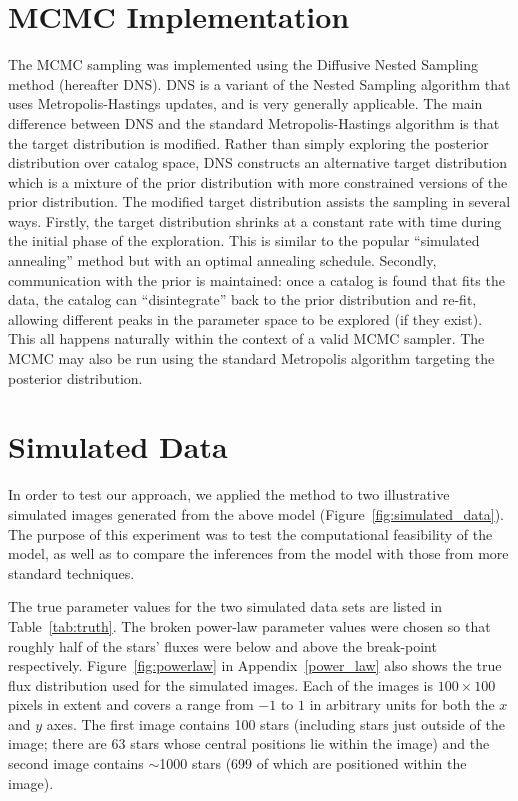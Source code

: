 \documentclass[12pt, preprint]{aastex}
\begin{document}
\section{MCMC Implementation}\label{sec:mcmc}
The MCMC sampling was implemented using the Diffusive Nested Sampling
\citep{dnest} method (hereafter DNS). DNS is a variant of the
Nested Sampling \citep{skilling} algorithm that uses Metropolis-Hastings
updates, and
is very generally applicable. The main difference between DNS and the standard
Metropolis-Hastings algorithm is that the target distribution is modified.
Rather than simply exploring the posterior distribution over catalog space,
DNS constructs an alternative target distribution which is a mixture of the
prior distribution with more constrained versions of the prior distribution.
The modified target distribution assists the sampling in several ways.
Firstly, the target distribution shrinks at a constant rate with time during the
initial phase of the exploration. This is similar to the popular ``simulated
annealing'' method \citep{annealing, neal} but with an optimal annealing schedule. Secondly,
communication with the prior is maintained: once a catalog is found that
fits the data, the catalog can ``disintegrate'' back to the prior distribution
and re-fit, allowing different peaks in the parameter space to be explored
(if they exist). This all happens naturally within the context of a valid
MCMC sampler. The MCMC may also be run using the standard Metropolis algorithm
targeting the posterior distribution.

\section{Simulated Data}\label{sec:simulated_data}
In order to test our approach, we applied the method to two illustrative
simulated images generated from
the above model (Figure~\ref{fig:simulated_data}). The purpose of this
experiment was to test the computational
feasibility of the model, as well as to compare the inferences from the model
with those from more standard techniques.

The true parameter values for the two simulated data sets are listed in
Table~\ref{tab:truth}. The broken power-law parameter values were chosen so that
roughly half of the stars' fluxes were below and above the break-point
respectively. Figure~\ref{fig:powerlaw} in Appendix~\ref{power_law} also shows the true flux distribution
used for the simulated images. Each of the images
is $100 \times 100$ pixels in extent and covers a range from $-1$ to $1$ in
arbitrary units for both the $x$ and $y$ axes. The first image contains
100 stars (including stars just outside of the image; there are 63 stars whose central
positions lie within the image) and the second
image contains $\sim$1000 stars (699 of which are positioned within the image).
\end{document}
